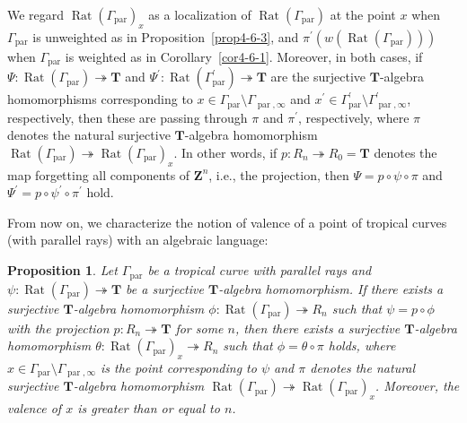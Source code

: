 \documentclass[a4paper,12pt]{amsart}
\newtheorem{prop}[dfn]{Proposition}
\def\Gamma{\varGamma}
\begin{document}
We regard $\operatorname{Rat}(\Gamma_{\operatorname{par}})_x$ as a localization of $\operatorname{Rat}(\Gamma_{\operatorname{par}})$ at the point $x$ when $\Gamma_{\operatorname{par}}$ is unweighted as in Proposition~\ref{prop4-6-3}, and $\pi^{\prime}(w(\operatorname{Rat}(\Gamma_{\operatorname{par}})))$ when $\Gamma_{\operatorname{par}}$ is weighted as in Corollary~\ref{cor4-6-1}.
Moreover, in both cases, if $\Psi : \operatorname{Rat}(\Gamma_{\operatorname{par}}) \twoheadrightarrow \boldsymbol{T}$ and $\Psi^{\prime} : \operatorname{Rat}(\Gamma^{\prime}_{\operatorname{par}}) \twoheadrightarrow \boldsymbol{T}$ are the surjective $\boldsymbol{T}$-algebra homomorphisms corresponding to $x \in \Gamma_{\operatorname{par}} \setminus \Gamma_{\operatorname{par}, \infty}$ and $x^{\prime} \in \Gamma^{\prime}_{\operatorname{par}} \setminus \Gamma^{\prime}_{\operatorname{par}, \infty}$, respectively, then these are passing through $\pi$ and $\pi^{\prime}$, respectively, where $\pi$ denotes the natural surjective $\boldsymbol{T}$-algebra homomorphism $\operatorname{Rat}(\Gamma_{\operatorname{par}}) \twoheadrightarrow \operatorname{Rat}(\Gamma_{\operatorname{par}})_x$.
In other words, if $p : R_n \twoheadrightarrow R_0 = \boldsymbol{T}$ denotes the map forgetting all components of $\boldsymbol{Z}^n$, i.e., the projection, then $\Psi = p \circ \psi \circ \pi$ and $\Psi^{\prime} = p \circ \psi^{\prime} \circ \pi^{\prime}$ hold.

From now on, we characterize the notion of valence of a point of tropical curves (with parallel rays) with an algebraic language:

\begin{prop}
    \label{prop4-6-4}
Let $\Gamma_{\operatorname{par}}$ be a tropical curve with parallel rays and $\psi : \operatorname{Rat}(\Gamma_{\operatorname{par}}) \twoheadrightarrow \boldsymbol{T}$ be a surjective $\boldsymbol{T}$-algebra homomorphism.
If there exists a surjective $\boldsymbol{T}$-algebra homomorphism $\phi : \operatorname{Rat}(\Gamma_{\operatorname{par}}) \twoheadrightarrow R_n$ such that $\psi = p \circ \phi$ with the projection $p : R_n \twoheadrightarrow \boldsymbol{T}$ for some $n$, then there exists a surjective $\boldsymbol{T}$-algebra homomorphism $\theta : \operatorname{Rat}(\Gamma_{\operatorname{par}})_x \twoheadrightarrow R_n$ such that $\phi = \theta \circ \pi$ holds, where $x \in \Gamma_{\operatorname{par}} \setminus \Gamma_{\operatorname{par}, \infty}$ is the point corresponding to $\psi$ and $\pi$ denotes the natural surjective $\boldsymbol{T}$-algebra homomorphism $\operatorname{Rat}(\Gamma_{\operatorname{par}}) \twoheadrightarrow \operatorname{Rat}(\Gamma_{\operatorname{par}})_x$.
Moreover, the valence of $x$ is greater than or equal to $n$.
\end{prop}
\end{document}
